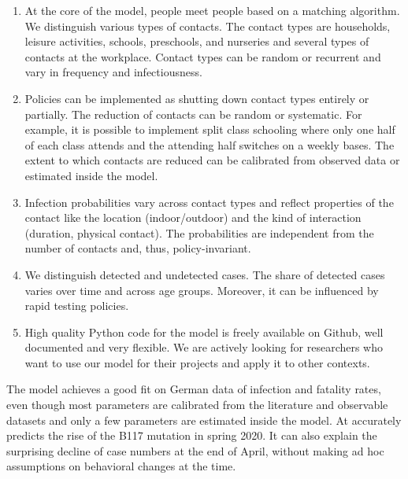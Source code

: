 \begin{enumerate}
    \item At the core of the model, people meet people based on a matching algorithm. We
          distinguish various types of contacts. The contact types are households,
          leisure activities, schools, preschools, and nurseries and several types of
          contacts at the workplace. Contact types can be random or recurrent and vary
          in frequency and infectiousness.

    \item Policies can be implemented as shutting down contact types entirely or
          partially. The reduction of contacts can be random or systematic. For example,
          it is possible to implement split class schooling where only one half of each
          class attends and the attending half switches on a weekly bases. The extent to which contacts are reduced can be calibrated from observed data or estimated inside the model.

    \item Infection probabilities vary across contact types and reflect properties of
          the contact like the location (indoor/outdoor) and the kind of interaction
          (duration, physical contact). The probabilities are independent from the
          number of contacts and, thus, policy-invariant.

    \item We distinguish detected and undetected cases. The share of detected cases varies over time and across age groups. Moreover, it can be influenced by rapid testing policies.
    \item High quality Python code for the model is freely available on Github, well
          documented and very flexible\footnotemark. We are actively looking for
          researchers who want to use our model for their projects and apply it to other
          contexts.
\end{enumerate}


The model achieves a good fit on German data of infection and fatality rates, even though most parameters are calibrated from the literature and observable datasets and only a few parameters are estimated inside the model. At accurately predicts the rise of the B117 mutation in spring 2020. It can also explain the surprising decline of case numbers at the end of April, without making ad hoc assumptions on behavioral changes at the time.

